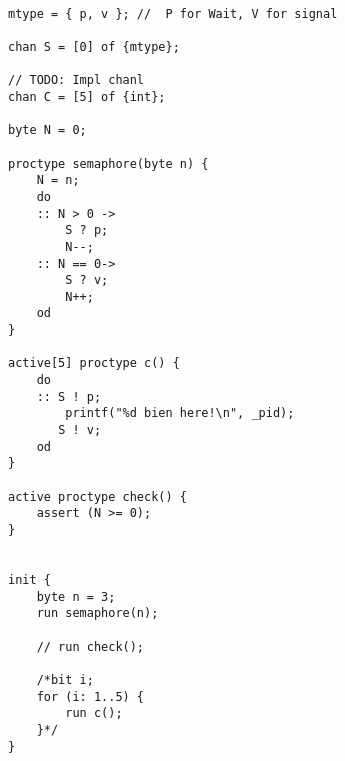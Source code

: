 \begin{lstlisting}[language=Promela]

mtype = { p, v }; //  P for Wait, V for signal

chan S = [0] of {mtype};

// TODO: Impl chanl
chan C = [5] of {int};

byte N = 0;

proctype semaphore(byte n) {
    N = n;
    do
    :: N > 0 ->
        S ? p;
        N--;
    :: N == 0->
        S ? v;
        N++;
    od
}

active[5] proctype c() {
    do 
    :: S ! p;
        printf("%d bien here!\n", _pid);
       S ! v;
    od
}

active proctype check() {
    assert (N >= 0);
}


init {
    byte n = 3;
    run semaphore(n);

    // run check();

    /*bit i;
    for (i: 1..5) {
        run c();
    }*/ 
}


\end{lstlisting}
